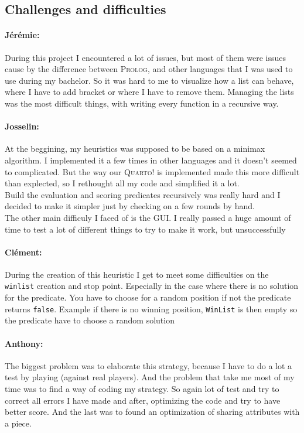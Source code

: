 \documentclass[a4paper,11pt]{article}
\newcommand{\tw}[1]{\texttt{#1}}
\begin{document}
		\subsection{Challenges and difficulties}
			\paragraph{Jérémie: } During this project I encountered a lot of issues, but most of them were issues cause by the difference between \textsc{Prolog}, and other languages that I was used to use during my bachelor. So it was hard to me to visualize how a list can behave, where I have to add bracket or where I have to remove them. Managing the lists was the most difficult things, with writing every function in a recursive way.

			\paragraph{Josselin:} At the beggining, my heuristics was supposed to be based on a minimax algorithm. I implemented it a few times in other languages and it doesn't seemed to complicated. But the way our \textsc{Quarto!} is implemented made this more difficult than explected, so I rethought all my code and simplified it a lot. \\
			Build the evaluation and scoring predicates recursively was really hard and I decided to make it simpler just by checking on a few rounds by hand. \\
			The other main difficuly I faced of is the GUI. I really passed a huge amount of time to test a lot of different things to try to make it work, but unsuccessfully

			\paragraph{Clément:} During the creation of this heuristic I get to meet some difficulties on the \tw{winlist} creation and stop point. Especially in the case where there is no solution for the predicate. You have to choose for a random position if not the predicate returns \tw{false}. Example if there is no winning position, \tw{WinList} is then empty so the predicate have to choose a random solution

			\paragraph{Anthony:} The biggest problem was to elaborate this strategy, because I have to do a lot a test by playing (against real players). And the problem that take me most of my time was to find a way of coding my strategy. So again lot of test and try to correct all errors I have made and after, optimizing the code and try to have better score. And the last was to found an optimization of sharing attributes with a piece.
	
\end{document}
